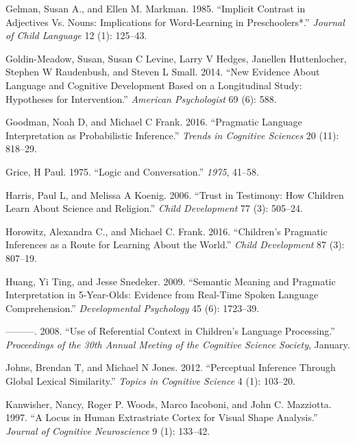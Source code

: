 \documentclass{ucetd}
\newlength{\cslhangindent}
\newenvironment{cslreferences}%
{\setlength{\parindent}{0pt}%
\everypar{\setlength{\hangindent}{\cslhangindent}}\ignorespaces}%
{\par}
\begin{document}
\begin{cslreferences}
\leavevmode\hypertarget{ref-gelman_implicit_1985}{}%
Gelman, Susan A., and Ellen M. Markman. 1985. ``Implicit Contrast in
Adjectives Vs. Nouns: Implications for Word-Learning in Preschoolers*.''
\emph{Journal of Child Language} 12 (1): 125--43.

\leavevmode\hypertarget{ref-goldin-meadow2014}{}%
Goldin-Meadow, Susan, Susan C Levine, Larry V Hedges, Janellen
Huttenlocher, Stephen W Raudenbush, and Steven L Small. 2014. ``New
Evidence About Language and Cognitive Development Based on a
Longitudinal Study: Hypotheses for Intervention.'' \emph{American
Psychologist} 69 (6): 588.

\leavevmode\hypertarget{ref-goodman2016}{}%
Goodman, Noah D, and Michael C Frank. 2016. ``Pragmatic Language
Interpretation as Probabilistic Inference.'' \emph{Trends in Cognitive
Sciences} 20 (11): 818--29.

\leavevmode\hypertarget{ref-grice1975logic}{}%
Grice, H Paul. 1975. ``Logic and Conversation.'' \emph{1975}, 41--58.

\leavevmode\hypertarget{ref-harris2006}{}%
Harris, Paul L, and Melissa A Koenig. 2006. ``Trust in Testimony: How
Children Learn About Science and Religion.'' \emph{Child Development} 77
(3): 505--24.

\leavevmode\hypertarget{ref-horowitz_childrens_2016}{}%
Horowitz, Alexandra C., and Michael C. Frank. 2016. ``Children's
Pragmatic Inferences as a Route for Learning About the World.''
\emph{Child Development} 87 (3): 807--19.

\leavevmode\hypertarget{ref-huang_semantic_2009}{}%
Huang, Yi Ting, and Jesse Snedeker. 2009. ``Semantic Meaning and
Pragmatic Interpretation in 5-Year-Olds: Evidence from Real-Time Spoken
Language Comprehension.'' \emph{Developmental Psychology} 45 (6):
1723--39.

\leavevmode\hypertarget{ref-huangsnedeker2008}{}%
---------. 2008. ``Use of Referential Context in Children's Language
Processing.'' \emph{Proceedings of the 30th Annual Meeting of the
Cognitive Science Society}, January.

\leavevmode\hypertarget{ref-johns2012}{}%
Johns, Brendan T, and Michael N Jones. 2012. ``Perceptual Inference
Through Global Lexical Similarity.'' \emph{Topics in Cognitive Science}
4 (1): 103--20.

\leavevmode\hypertarget{ref-kanwisher}{}%
Kanwisher, Nancy, Roger P. Woods, Marco Iacoboni, and John C. Mazziotta.
1997. ``A Locus in Human Extrastriate Cortex for Visual Shape
Analysis.'' \emph{Journal of Cognitive Neuroscience} 9 (1): 133--42.


\end{cslreferences}
\end{document}
